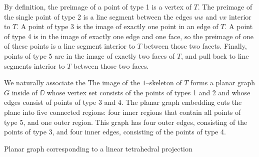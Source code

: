 By definition, the preimage of a point of type 1 is a vertex of $T$.
The preimage of the single point of type 2 is a line segment between the edges $uw$ and $vx$ interior to $T$.
A point of type 3 is the image of exactly one point in an edge of $T$.
A point of type 4 is in the image of exactly one edge and one face, so the preimage of one of these points is a line segment interior to $T$ between those two facets.
Finally, points of type 5 are in the image of exactly two faces of $T$, and pull back to line segments interior to $T$ between those two faces.

We naturally associate the 
The image of the $1$--skeleton of $T$ forms a planar graph $G$ inside of $\DD$ whose vertex set consists of the points of types 1 and 2 and whose edges consist of points of type 3 and 4.
The planar graph embedding cuts the plane into five connected regions: four inner regions that contain all points of type 5, and one outer region.
This graph has four outer edges, consisting of the points of type 3, and four inner edges, consisting of the points of type 4.

\begin{algorithm}
	\label{alg:lintetTOplanar}
	\caption{Planar graph corresponding to a linear tetrahedral projection}
\end{algorithm}


